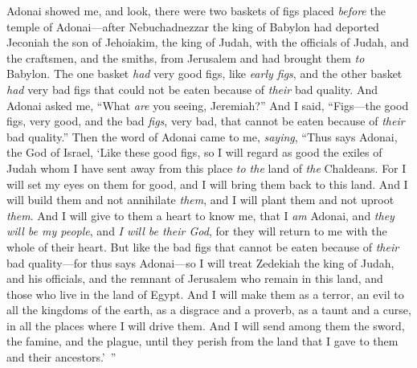 \begin{biblechapter} %
 Adonai showed me, and look, there were two baskets of figs placed \textit{before} the temple of Adonai—after Nebuchadnezzar the king of Babylon had deported Jeconiah the son of Jehoiakim, the king of Judah, with the officials of Judah, and the craftsmen, and the smiths, from Jerusalem and had brought them \textit{to} Babylon.
\verse The one basket \textit{had} very good figs, like \textit{early figs}, and the other basket \textit{had} very bad figs that could not be eaten because of \textit{their} bad quality.
\verse And Adonai asked me, “What \textit{are} you seeing, Jeremiah?” And I said, “Figs—the good figs, very good, and the bad \textit{figs}, very bad, that cannot be eaten because of \textit{their} bad quality.”
\verse Then the word of Adonai came to me, \textit{saying},
\verse “Thus says Adonai, the God of Israel, ‘Like these good figs, so I will regard as good the exiles of Judah whom I have sent away from this place \textit{to the} land of \textit{the} Chaldeans.
\verse For I will set my eyes on them for good, and I will bring them back to this land. And I will build them and not annihilate \textit{them}, and I will plant them and not uproot \textit{them}.
\verse And I will give to them a heart to know me, that I \textit{am} Adonai, and \textit{they will be my people}, and \textit{I will be their God}, for they will return to me with the whole of their heart.
\verse But like the bad figs that cannot be eaten because of \textit{their} bad quality—for thus says Adonai—so I will treat Zedekiah the king of Judah, and his officials, and the remnant of Jerusalem who remain in this land, and those who live in the land of Egypt.
\verse And I will make them as a terror, an evil to all the kingdoms of the earth, as a disgrace and a proverb, as a taunt and a curse, in all the places where I will drive them.
\verse And I will send among them the sword, the famine, and the plague, until they perish from the land that I gave to them and their ancestors.’ ”
\end{biblechapter}


